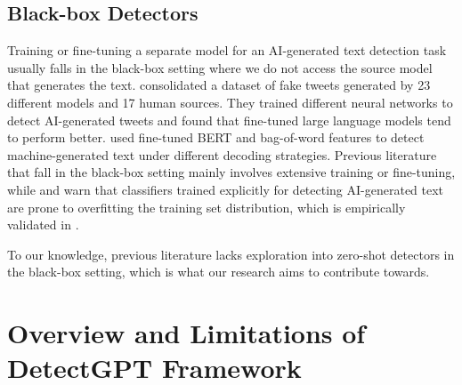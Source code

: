 \documentclass[11pt]{article}
\begin{document}
\subsection{Black-box Detectors}
Training or fine-tuning a separate model for an AI-generated text detection task usually falls in the black-box setting where we do not access the source model that generates the text. \citet{Fagni2020TweepFakeAD} consolidated a dataset of fake tweets generated by 23 different models and 17 human sources. They trained different neural networks to detect AI-generated tweets and found that fine-tuned large language models tend to perform better. \citet{Ippolito2019AutomaticDO} used fine-tuned BERT and bag-of-word features to detect machine-generated text under different decoding strategies. Previous literature that fall in the black-box setting mainly involves extensive training or fine-tuning, while \citet{Bakhtin2019RealOF} and \citet{Uchendu2020AuthorshipAF} warn that classifiers trained explicitly for detecting AI-generated text are prone to overfitting the training set distribution, which is empirically validated in \citet{detectgpt}.

To our knowledge, previous literature lacks exploration into zero-shot detectors in the black-box setting, which is what our research aims to contribute towards.

\section{Overview and Limitations of DetectGPT Framework} \label{3}
\end{document}
